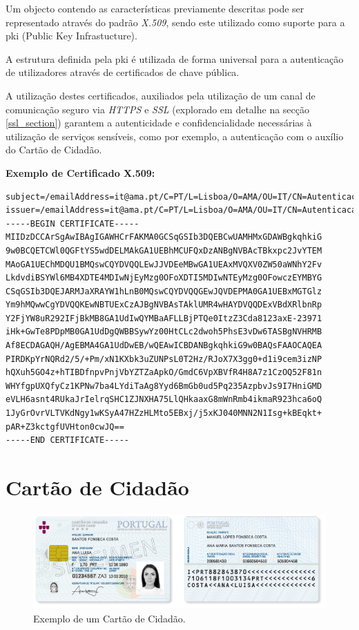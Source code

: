 Um objecto contendo as características previamente descritas pode ser representado através do padrão \emph{X.509}, sendo este utilizado como suporte para a \gls{pki} (Public Key Infrastucture).

A estrutura definida pela \gls{pki} é utilizada de forma universal para a autenticação de utilizadores através de certificados de chave pública.\cite{pki}

A utilização destes certificados, auxiliados pela utilização de um canal de comunicação seguro via \emph{HTTPS} e \emph{SSL} (explorado em detalhe na secção \ref{ssl_section}) garantem a autenticidade e confidencialidade necessárias à utilização de serviços sensíveis, como por exemplo, a autenticação com o auxílio do Cartão de Cidadão.

\vspace{10mm}
\textbf{Exemplo de Certificado X.509:}
\begin{verbatim}
subject=/emailAddress=it@ama.pt/C=PT/L=Lisboa/O=AMA/OU=IT/CN=Autenticacao.Gov
issuer=/emailAddress=it@ama.pt/C=PT/L=Lisboa/O=AMA/OU=IT/CN=Autenticacao.Gov
-----BEGIN CERTIFICATE-----
MIIDzDCCArSgAwIBAgIGAWHCrFAKMA0GCSqGSIb3DQEBCwUAMHMxGDAWBgkqhkiG
9w0BCQETCWl0QGFtYS5wdDELMAkGA1UEBhMCUFQxDzANBgNVBAcTBkxpc2JvYTEM
MAoGA1UEChMDQU1BMQswCQYDVQQLEwJJVDEeMBwGA1UEAxMVQXV0ZW50aWNhY2Fv
LkdvdiBSYWl6MB4XDTE4MDIwNjEyMzg0OFoXDTI5MDIwNTEyMzg0OFowczEYMBYG
CSqGSIb3DQEJARMJaXRAYW1hLnB0MQswCQYDVQQGEwJQVDEPMA0GA1UEBxMGTGlz
Ym9hMQwwCgYDVQQKEwNBTUExCzAJBgNVBAsTAklUMR4wHAYDVQQDExVBdXRlbnRp
Y2FjYW8uR292IFjBkMB8GA1UdIwQYMBaAFLLBjPTQe0ItzZ3Cda8123axE-23971
iHk+GwTe8PDpMB0GA1UdDgQWBBSywYz00HtCLc2dwoh5PhsE3vDw6TASBgNVHRMB
Af8ECDAGAQH/AgEBMA4GA1UdDwEB/wQEAwICBDANBgkqhkiG9w0BAQsFAAOCAQEA
PIRDKpYrNQRd2/5/+Pm/xN1KXbk3uZUNPsL0T2Hz/RJoX7X3gg0+d1i9cem3izNP
hQXuh5GO4z+hTIBDfnpvPnjVbYZTZaApkO/GmdC6VpXBVfR4H8A7z1CzOQ52F81n
WHYfgpUXQfyCz1KPNw7ba4LYdiTaAg8Yyd6BmGb0ud5Pq235AzpbvJs9I7HniGMD
eVLH6asnt4RUkaJrIelrqSHC1ZJNXHA75LlQHkaaxG8mWnRmb4ikmaR923hca6oQ
1JyGrOvrVLTVKdNgy1wKSyA47HZzHLMto5EBxj/j5xKJ040MNN2N1Isg+kBEqkt+
pAR+Z3kctgfUVHton0cwJQ==
-----END CERTIFICATE-----
\end{verbatim}

\newpage
\section{Cartão de Cidadão}

\begin{figure}[h]
    \centering
    \includegraphics[width=\textwidth]{img/cc/CartaoCidadao.png}
    \caption{Exemplo de um Cartão de Cidadão\cite{ccPic}.}
\end{figure}

